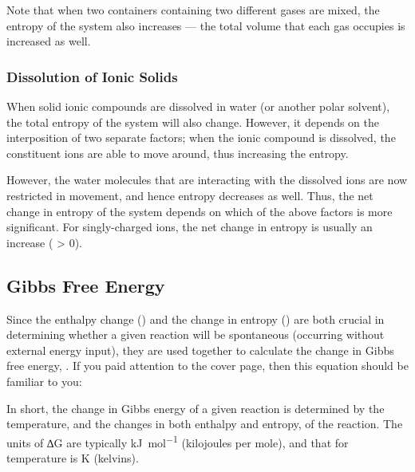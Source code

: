 				Note that when two containers containing two different gases are mixed, the entropy of the system also increases --- the total
				volume that each gas occupies is increased as well.



			\subsubsection{Dissolution of Ionic Solids}

				When solid ionic compounds are dissolved in water (or another polar solvent), the total entropy of the system will also change.
				However, it depends on the interposition of two separate factors; when the ionic compound is dissolved, the constituent ions are
				able to move around, thus increasing the entropy.

				However, the water molecules that are interacting with the dissolved ions are now restricted in movement, and hence entropy decreases
				as well. Thus, the net change in entropy of the system depends on which of the above factors is more significant. For singly-charged
				ions, the net change in entropy is usually an increase (\entr{} > 0).




		\pagebreak
		\subsection{Gibbs Free Energy}

			Since the enthalpy change (\enth{}) and the change in entropy (\entr{}) are both crucial in determining whether a given reaction will
			be spontaneous (occurring without external energy input), they are used together to calculate the change in Gibbs free energy, \gibb{}.
			If you paid attention to the cover page, then this equation should be familiar to you:


			In short, the change in Gibbs energy of a given reaction is determined by the temperature, and the changes in both enthalpy and entropy,
			of the reaction. The units of ∆G are typically \si{\kilo\joule\per\mole} (kilojoules per mole), and that for temperature is \si{\kelvin}
			(kelvins).

